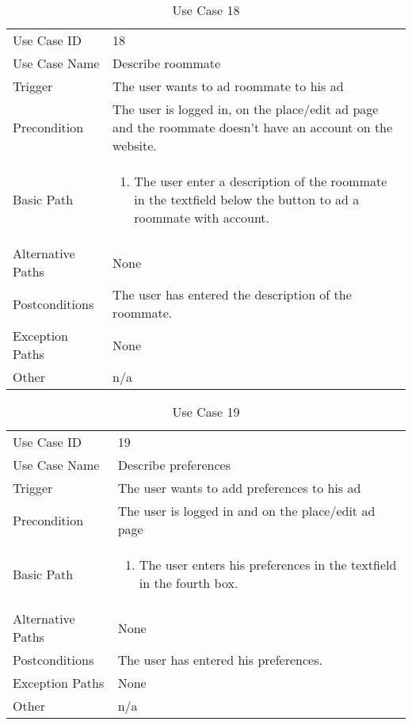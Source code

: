 \begin{table}[H]
\centering
\label{table-use-case-18}
\begin{tabular}{|p{3cm}|p{10cm}}
Use Case ID       & 18                                                      \\
Use Case Name     & Describe roommate                            \\
Trigger           & The user wants to ad roommate to his ad\\
Precondition      & The user is logged in, on the place/edit ad page and the
roommate doesn't have an account on the website.
\\
Basic Path        & \begin{enumerate}
\item		The user enter a description of the roommate in the textfield below the
button to ad a roommate with account.
\end{enumerate} 
     \\
Alternative Paths & None                          \\
Postconditions    & The user has entered the description of the roommate.\\
Exception Paths   & None			\\
Other             & n/a                                                                                                                                                                                                        
\end{tabular}
\caption{Use Case 18}
\end{table}

\begin{table}[H]
\centering
\label{table-use-case-19}
\begin{tabular}{|p{3cm}|p{10cm}}
Use Case ID       & 19                                                      \\
Use Case Name     & Describe preferences                            \\
Trigger           & The user wants to add preferences to his ad\\
Precondition      & The user is logged in and on the place/edit ad page
\\
Basic Path        & \begin{enumerate}
\item		The user enters his preferences in the textfield in the fourth box.
\end{enumerate} 
     \\
Alternative Paths & None                          \\
Postconditions    & The user has entered his preferences.\\
Exception Paths   & None			\\
Other             & n/a                                                                                                                                                                                                        
\end{tabular}
\caption{Use Case 19}
\end{table}

